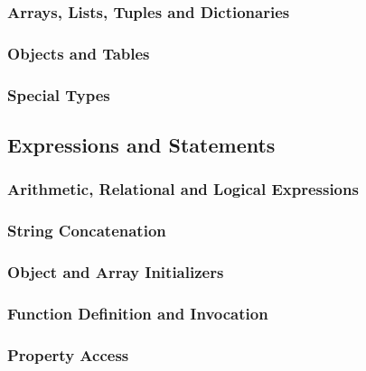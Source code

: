 \subsubsection{Arrays, Lists, Tuples and Dictionaries}

\subsubsection{Objects and Tables}

\subsubsection{Special Types}

\subsection{Expressions and Statements}
\subsubsection{Arithmetic, Relational and Logical Expressions}
\subsubsection{String Concatenation}
\subsubsection{Object and Array Initializers}
\subsubsection{Function Definition and Invocation}
\subsubsection{Property Access}

